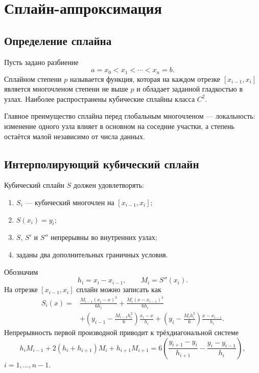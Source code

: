 \section{Сплайн-аппроксимация}
\label{sec:spline-approximation}

\subsection{Определение сплайна}

Пусть задано разбиение
\[
    a=x_0<x_1<\cdots<x_n=b.
\]
Сплайном степени $p$ называется функция, которая на каждом отрезке
$[x_{i-1},x_i]$ является многочленом степени не выше $p$ и обладает заданной
гладкостью в узлах. Наиболее распространены кубические сплайны класса $C^2$.

Главное преимущество сплайна перед глобальным многочленом --- локальность:
изменение одного узла влияет в основном на соседние участки, а степень остаётся
малой независимо от числа данных.

\subsection{Интерполирующий кубический сплайн}

Кубический сплайн $S$ должен удовлетворять:
\begin{enumerate}
    \item $S_i$ --- кубический многочлен на $[x_{i-1},x_i]$;
    \item $S(x_i)=y_i$;
    \item $S$, $S'$ и $S''$ непрерывны во внутренних узлах;
    \item заданы два дополнительных граничных условия.
\end{enumerate}

Обозначим
\[
    h_i=x_i-x_{i-1},
    \qquad
    M_i=S''(x_i).
\]
На отрезке $[x_{i-1},x_i]$ сплайн можно записать как
\[
\begin{aligned}
S_i(x)=&
\frac{M_{i-1}(x_i-x)^3}{6h_i}
+\frac{M_i(x-x_{i-1})^3}{6h_i}\\
&+\left(y_{i-1}-\frac{M_{i-1}h_i^2}{6}\right)
  \frac{x_i-x}{h_i}
+\left(y_i-\frac{M_i h_i^2}{6}\right)
  \frac{x-x_{i-1}}{h_i}.
\end{aligned}
\]
Непрерывность первой производной приводит к трёхдиагональной системе
\[
    h_iM_{i-1}+2(h_i+h_{i+1})M_i+h_{i+1}M_{i+1}
    =
    6\left(
    \frac{y_{i+1}-y_i}{h_{i+1}}
    -\frac{y_i-y_{i-1}}{h_i}
    \right),
\]
$i=1,\ldots,n-1$.

